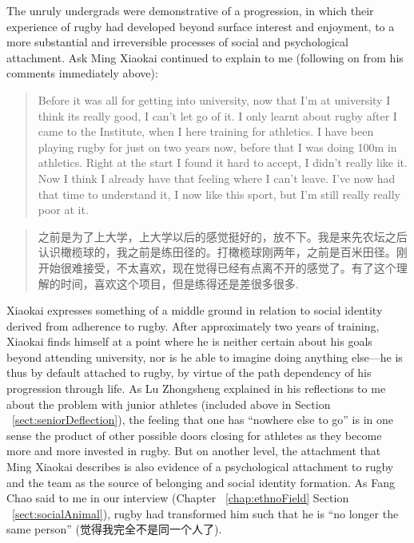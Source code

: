 \begin{CJK}{UTF8}{gbsn}
The unruly undergrads were demonstrative of a progression, in which their experience of rugby had developed beyond surface interest and enjoyment, to a more substantial and irreversible processes of social and psychological attachment.  Ask Ming Xiaokai continued to explain to me (following on from his comments immediately above):

\begin{quote}
    Before it was all for getting into university, now that I'm at university I think its really good, I can't let go of it.
    I only learnt about rugby after I came to the Institute, when I here training for athletics.  I have been playing rugby for just on two years now, before that I was doing 100m in athletics.  Right at the start I found it hard to accept, I didn’t really like it. Now I think I already have that feeling where I can’t leave.  I’ve now had that time to understand it, I now like this sport, but I’m still really really poor at it.
\end{quote}

\begin{quote}
    之前是为了上大学，上大学以后的感觉挺好的，放不下。我是来先农坛之后认识橄榄球的，我之前是练田径的。打橄榄球刚两年，之前是百米田径。刚开始很难接受，不太喜欢，现在觉得已经有点离不开的感觉了。有了这个理解的时间，喜欢这个项目，但是练得还是差很多很多.
\end{quote}

Xiaokai expresses something of a middle ground in relation to social identity derived from adherence to rugby.  After approximately two years of training, Xiaokai finds himself at a point where he is neither certain about his goals beyond attending university, nor is he able to imagine doing anything else---he is thus by default attached to rugby, by virtue of the path dependency of his progression through life.  As Lu Zhongsheng explained in his reflections to me about the problem with junior athletes (included above in Section ~\ref{sect:seniorDeflection}), the feeling that one has ``nowhere else to go'' is in one sense the product of other possible doors closing for athletes as they become more and more invested in rugby.  But on another level, the attachment that Ming Xiaokai describes is also evidence of a psychological attachment to rugby and the team as the source of belonging and social identity formation.   As Fang Chao said to me in our interview (Chapter ~\ref{chap:ethnoField} Section ~\ref{sect:socialAnimal}), rugby had transformed him such that he is ``no longer the same person'' (觉得我完全不是同一个人了).


\end{CJK}
